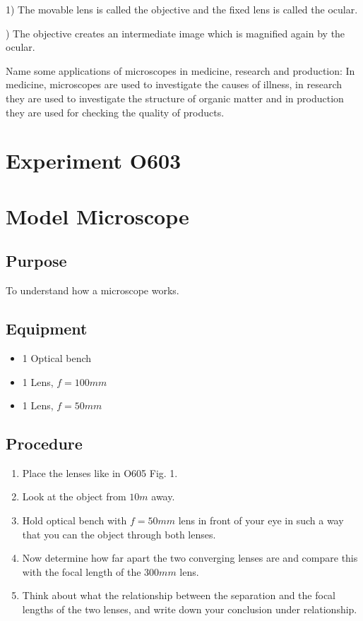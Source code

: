 \documentclass[12pt]{article}
\begin{document}
1) The movable lens is called the objective and the fixed lens is called the ocular.

) The objective creates an intermediate image which is magnified again by the ocular.

Name some applications of microscopes in medicine, research and production:
In medicine, microscopes are used to investigate the causes of illness, in research they are used to investigate the structure of organic matter and in production they are used for checking the quality of products.

\newpage

\section*{Experiment O603}

\section*{Model Microscope}

\subsection*{Purpose}

To understand how a microscope works.

\subsection*{Equipment}

\begin{itemize}
\item 1 Optical bench
\item 1 Lens, $f=100 mm$
\item 1 Lens, $f=50 mm$
\end{itemize}

\subsection*{Procedure}

\begin{enumerate}
\item Place the lenses like in O605 Fig. 1.
\item Look at the object from $10m$ away.
\item Hold optical bench with $f=50mm$ lens in front of your eye in such a way that you can the object through both lenses.
\item Now determine how far apart the two converging lenses are and compare this with the focal length of the $300mm$ lens.
\item Think about what the relationship between the separation and the focal lengths of the two lenses, and write down your conclusion under relationship.
\end{enumerate}
\end{document}
